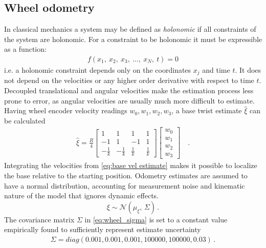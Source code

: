 \documentclass[times, utf8, diplomski, english]{fer}
\begin{document}
\subsection{Wheel odometry}
In classical mechanics a system may be defined as \textit{holonomic} if all constraints of the system are holonomic. For a constraint to be holonomic it must be expressible as a function:
\begin{align}
f(x_1,\ x_2,\ x_3,\ \ldots,\ x_N,\ t)=0
\end{align} 
i.e. a holonomic constraint depends only on the coordinates $x_j$ and time $t$. It does not depend on the velocities or any higher order derivative with respect to time $t$.
Decoupled translational and angular velocities make the estimation process less prone to error, as angular velocities are usually much more difficult to estimate.
Having wheel encoder velocity readings $w_0,w_1,w_2,w_3$, a base twist estimate $\hat{\xi}$ can be calculated
\begin{align}
\hat{\xi}
= 
\frac{R}{4}
\begin{bmatrix}
1 &1 &1 &1 \\
-1 &1 &-1 &1 \\
-\frac{1}{k} &-\frac{1}{k} &\frac{1}{k} &\frac{1}{k}
\end{bmatrix}
\begin{bmatrix}
w_0 \\
w_1 \\
w_2 \\ 
w_3
\end{bmatrix} \quad .
\label{eq:base vel estimate}
\end{align}
Integrating the velocities from \eqref{eq:base vel estimate} makes it possible to localize the base relative to the starting position.
Odometry estimates are assumed to have a normal distribution, accounting for measurement noise and kinematic nature of the model that ignores dynamic effects.
\begin{equation}\label{eq:wheel_sigma}
\xi \sim \mathcal{N}(\mu_\xi,\,\Sigma)\,.
\end{equation}
The covariance matrix $\Sigma$ in \eqref{eq:wheel_sigma} is set to a constant value empirically found to sufficiently represent estimate uncertainty
\begin{align}
\Sigma 
=
diag\left(0.001,0.001,0.001,100000,100000,0.03\right)\,.
\end{align}
\end{document}
